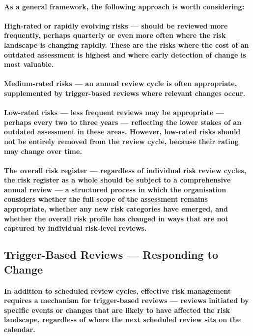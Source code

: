 \paragraph{As a general framework, the following approach is worth considering:}
\paragraph{\textbf{High-rated or rapidly evolving risks} — should be reviewed more frequently, perhaps quarterly or even more often where the risk landscape is changing rapidly. These are the risks where the cost of an outdated assessment is highest and where early detection of change is most valuable.}
\paragraph{\textbf{Medium-rated risks} — an annual review cycle is often appropriate, supplemented by trigger-based reviews where relevant changes occur.}
\paragraph{\textbf{Low-rated risks} — less frequent reviews may be appropriate — perhaps every two to three years — reflecting the lower stakes of an outdated assessment in these areas. However, low-rated risks should not be entirely removed from the review cycle, because their rating may change over time.}
\paragraph{\textbf{The overall risk register} — regardless of individual risk review cycles, the risk register as a whole should be subject to a comprehensive annual review — a structured process in which the organisation considers whether the full scope of the assessment remains appropriate, whether any new risk categories have emerged, and whether the overall risk profile has changed in ways that are not captured by individual risk-level reviews.}

\subsection{Trigger-Based Reviews — Responding to Change}
\paragraph{In addition to scheduled review cycles, effective risk management requires a mechanism for trigger-based reviews — reviews initiated by specific events or changes that are likely to have affected the risk landscape, regardless of where the next scheduled review sits on the calendar.}
